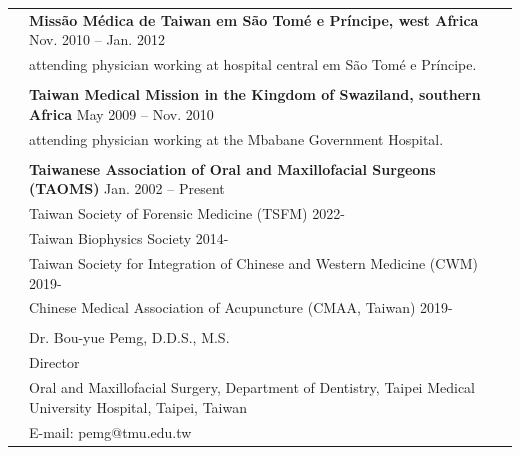 \begin{longtable}{p{1.3in}p{4.8in}}
& \textbf{Missão Médica de Taiwan em São Tomé e Príncipe, west Africa} \hfill Nov. 2010 -- Jan. 2012 \\
& attending physician working at hospital central em São Tomé e Príncipe. \\
& \\

& \textbf{Taiwan Medical Mission in the Kingdom of Swaziland, southern Africa} \hfill May 2009 -- Nov. 2010 \\
& attending physician working at the Mbabane Government Hospital. \\
& \\


\nohyphens{\color{OliveGreen}{Professional memberships}}
& {\textbf{Taiwanese Association of Oral and Maxillofacial Surgeons (TAOMS)}} \hfill Jan. 2002 -- Present \\
& Taiwan Society of Forensic Medicine (TSFM) \hfill 2022-\\ 
& Taiwan Biophysics Society \hfill 2014-\\ 
& Taiwan Society for Integration of Chinese and Western Medicine (CWM) \hfill 2019-\\
& Chinese Medical Association of Acupuncture (CMAA, Taiwan) \hfill 2019- \\
& \\




\nohyphens{\color{OliveGreen}{References}} 
& Dr. Bou-yue Pemg, D.D.S., M.S.\\
& Director\\
& Oral and Maxillofacial Surgery, Department of Dentistry,
Taipei Medical University Hospital,
Taipei, Taiwan\\
& E-mail: pemg@tmu.edu.tw\\[0.5cm]



\end{longtable}
